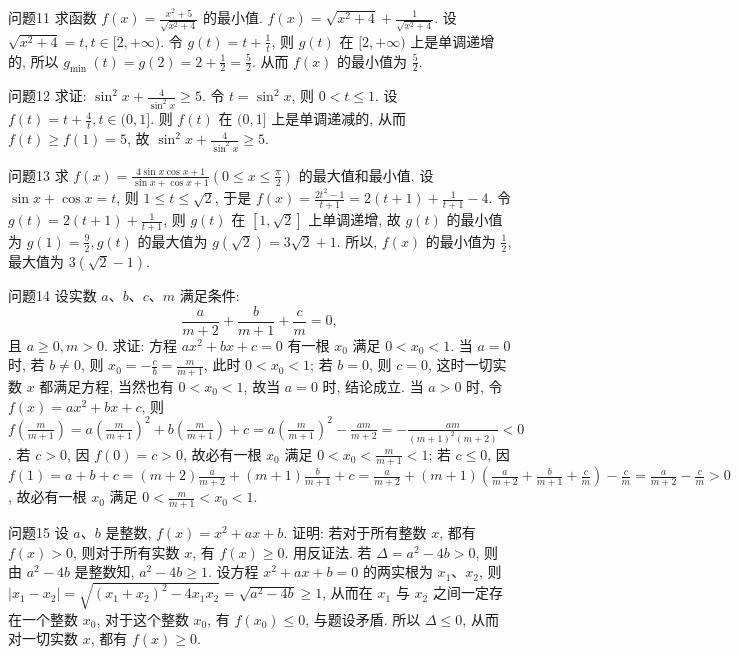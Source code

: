问题11 求函数 $f(x)=\frac{x^2+5}{\sqrt{x^2+4}}$ 的最小值.
$f(x)=\sqrt{x^2+4}+\frac{1}{\sqrt{x^2+4}}$. 设 $\sqrt{x^2+4}=t, t \in[2,+\infty)$. 令 $g(t)=t+\frac{1}{t}$, 则 $g(t)$ 在 $[2,+\infty)$ 上是单调递增的, 所以 $g_{\text {min }}(t)=g(2)= 2+\frac{1}{2}=\frac{5}{2}$. 从而 $f(x)$ 的最小值为 $\frac{5}{2}$.



问题12 求证: $\sin ^2 x+\frac{4}{\sin ^2 x} \geqslant 5$.
令 $t=\sin ^2 x$, 则 $0<t \leqslant 1$. 设 $f(t)=t+\frac{4}{t}, t \in(0,1]$. 则 $f(t)$ 在 $(0,1]$ 上是单调递减的, 从而 $f(t) \geqslant f(1)=5$, 故 $\sin ^2 x+\frac{4}{\sin ^2 x} \geqslant 5$.



问题13 求 $f(x)=\frac{4 \sin x \cos x+1}{\sin x+\cos x+1}\left(0 \leqslant x \leqslant \frac{\pi}{2}\right)$ 的最大值和最小值.
设 $\sin x+\cos x=t$, 则 $1 \leqslant t \leqslant \sqrt{2}$, 于是 $f(x)=\frac{2 t^2-1}{t+1}=2(t+1)+ \frac{1}{t+1}-4$. 令 $g(t)=2(t+1)+\frac{1}{t+1}$, 则 $g(t)$ 在 $[1, \sqrt{2}]$ 上单调递增, 故 $g(t)$ 的最小值为 $g(1)=\frac{9}{2}, g(t)$ 的最大值为 $g(\sqrt{2})=3 \sqrt{2}+1$. 所以, $f(x)$ 的最小值为 $\frac{1}{2}$, 最大值为 $3(\sqrt{2}-1)$.



问题14 设实数 $a 、 b 、 c 、 m$ 满足条件:
$$
\frac{a}{m+2}+\frac{b}{m+1}+\frac{c}{m}=0,
$$
且 $a \geqslant 0, m>0$. 求证: 方程 $a x^2+b x+c=0$ 有一根 $x_0$ 满足 $0<x_0<1$. 
当 $a=0$ 时, 若 $b \neq 0$, 则 $x_0=-\frac{c}{b}=\frac{m}{m+1}$, 此时 $0<x_0<1$; 若 $b=0$, 则 $c=0$, 这时一切实数 $x$ 都满足方程, 当然也有 $0<x_0<1$, 故当 $a=0$ 时, 结论成立.
当 $a>0$ 时, 令 $f(x)=a x^2+b x+c$, 则 $f\left(\frac{m}{m+1}\right)=a\left(\frac{m}{m+1}\right)^2 +b\left(\frac{m}{m+1}\right)+c=a\left(\frac{m}{m+1}\right)^2-\frac{a m}{m+2}=-\frac{a m}{(m+1)^2(m+2)}<0$. 若 $c>0$, 因 $f(0)=c>0$, 故必有一根 $x_0$ 满足 $0<x_0<\frac{m}{m+1}<1$; 若 $c \leqslant 0$, 因 $f(1)=a+b+c=(m+2) \frac{a}{m+2}+(m+1) \frac{b}{m+1}+c=\frac{a}{m+2}+(m+1)\left(\frac{a}{m+2}+\frac{b}{m+1}+\frac{c}{m}\right)-\frac{c}{m}=\frac{a}{m+2}-\frac{c}{m}>0$, 故必有一根 $x_0$ 满足 $0< \frac{m}{m+1}<x_0<1$.



问题15 设 $a 、 b$ 是整数, $f(x)=x^2+a x+b$. 证明: 若对于所有整数 $x$, 都有 $f(x)>0$, 则对于所有实数 $x$, 有 $f(x) \geqslant 0$.
用反证法.
若 $\Delta=a^2-4 b>0$, 则由 $a^2-4 b$ 是整数知, $a^2-4 b \geqslant 1$. 设方程 $x^2+a x+b=0$ 的两实根为 $x_1 、 x_2$, 则 $\left|x_1-x_2\right|= \sqrt{\left(x_1+x_2\right)^2-4 x_1 x_2}=\sqrt{a^2-4 b} \geqslant 1$, 从而在 $x_1$ 与 $x_2$ 之间一定存在一个整数 $x_0$, 对于这个整数 $x_0$, 有 $f\left(x_0\right) \leqslant 0$, 与题设矛盾.
所以 $\Delta \leqslant 0$, 从而对一切实数 $x$, 都有 $f(x) \geqslant 0$.



